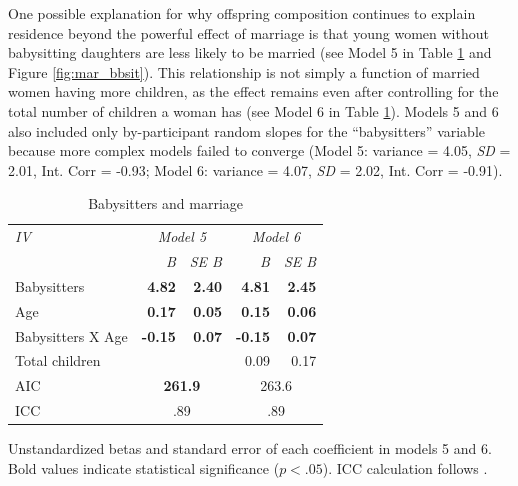 \documentclass[10pt]{article}
\begin{document}
One possible explanation for why offspring composition continues to explain residence beyond the powerful effect of marriage is that young women without babysitting daughters are less likely to be married (see Model 5 in Table \ref{tab:mar_bbsit_tab} and Figure \ref{fig:mar_bbsit}).  This relationship is not simply a function of married women having more children, as the effect remains even after controlling for the total number of children a woman has (see Model 6 in Table \ref{tab:mar_bbsit_tab}).  Models 5 and 6 also included only by-participant random slopes for the ``babysitters'' variable because more complex models failed to converge (Model 5: variance = 4.05, \emph{SD} = 2.01, Int. Corr = -0.93; Model 6: variance = 4.07, \emph{SD} = 2.02, Int. Corr = -0.91). 

\begin{table}[!tb]
\caption {Babysitters and marriage \label{tab:mar_bbsit_tab} }
  \centering
  \begin{tabular}{| l | r r | r r |} 
  	\hline
	\emph{IV} & \multicolumn{2}{|c|}{\emph{Model 5}} & \multicolumn{2}{|c|}{\emph{Model 6}}\\ 
	& \emph{B} & \emph{SE B} & \emph{B} & \emph{SE B} \\ \hline
	Babysitters & \textbf{4.82} & \textbf{2.40} & \textbf{4.81} & \textbf{2.45} \\	
	Age  & \textbf{0.17} & \textbf{0.05} & \textbf{0.15} & \textbf{0.06} \\
	Babysitters X Age & \textbf{-0.15} & \textbf{0.07} & \textbf{-0.15} & \textbf{0.07} \\
	Total children & & & 0.09 & 0.17 \\
	AIC & \multicolumn{2}{|c|}{\textbf{261.9}} & \multicolumn{2}{|c|}{263.6}\\
	ICC & \multicolumn{2}{|c|}{.89} & \multicolumn{2}{|c|}{.89}\\ \hline
  \end{tabular}  
  
{Unstandardized betas and standard error of each coefficient in models 5 and 6.  Bold values indicate statistical significance ($p < .05$).  ICC calculation follows \citep{zeger1988models}.}
\end{table}
\end{document}
